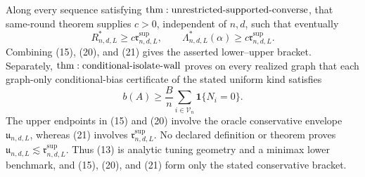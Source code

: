 Along every sequence satisfying \({\rm thm:unrestricted\text{-}supported\text{-}converse}\), that same-round theorem supplies \(c>0\), independent of \(n,d\), such that eventually
\[
 R^*_{n,d,L}\geq c\mathfrak r^{\mathrm{sup}}_{n,d,L},
 \qquad
 \Lambda^*_{n,d,L}(\alpha)
 \geq c\mathfrak r^{\mathrm{sup}}_{n,d,L}.
\tag{21}
\]
Combining (15), (20), and (21) gives the asserted lower--upper bracket.  Separately, \({\rm thm:conditional\text{-}isolate\text{-}wall}\) proves on every realized graph that each graph-only conditional-bias certificate of the stated uniform kind satisfies
\[
 b(A)\geq\frac{B}{n}
 \sum_{i\in\mathcal V_n}\mathbf1\{N_i=0\}.
\tag{22}
\]
The upper endpoints in (15) and (20) involve the oracle conservative envelope \(\mathfrak u_{n,d,L}\), whereas (21) involves \(\mathfrak r^{\mathrm{sup}}_{n,d,L}\).  No declared definition or theorem proves \(\mathfrak u_{n,d,L}\lesssim\mathfrak r^{\mathrm{sup}}_{n,d,L}\).  Thus (13) is analytic tuning geometry and a minimax lower benchmark, and (15), (20), and (21) form only the stated conservative bracket.